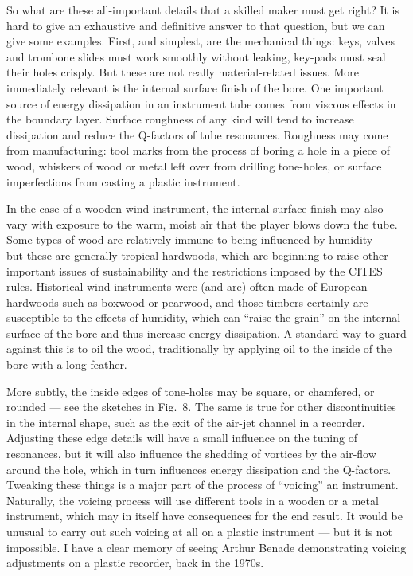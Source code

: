   So what are these all-important details that a skilled maker must get right? 
  It is hard to give an exhaustive and definitive answer to that question, but 
  we can give some examples. First, and simplest, are the mechanical things: 
  keys, valves and trombone slides must work smoothly without leaking, key-pads 
  must seal their holes crisply. But these are not really material-related 
  issues. More immediately relevant is the internal surface finish of the bore. 
  One important source of energy dissipation in an instrument tube comes from 
  viscous effects in the boundary layer. Surface roughness of any kind will 
  tend to increase dissipation and reduce the Q-factors of tube resonances. 
  Roughness may come from manufacturing: tool marks from the process of boring 
  a hole in a piece of wood, whiskers of wood or metal left over from drilling 
  tone-holes, or surface imperfections from casting a plastic instrument. 

  In the case of a wooden wind instrument, the internal surface finish may also 
  vary with exposure to the warm, moist air that the player blows down the 
  tube. Some types of wood are relatively immune to being influenced by 
  humidity — but these are generally tropical hardwoods, which are beginning to 
  raise other important issues of sustainability and the restrictions imposed 
  by the CITES rules. Historical wind instruments were (and are) often made of 
  European hardwoods such as boxwood or pearwood, and those timbers certainly 
  are susceptible to the effects of humidity, which can “raise the grain” on 
  the internal surface of the bore and thus increase energy dissipation. A 
  standard way to guard against this is to oil the wood, traditionally by 
  applying oil to the inside of the bore with a long feather. 

  More subtly, the inside edges of tone-holes may be square, or chamfered, or 
  rounded — see the sketches in Fig.\ 8. The same is true for other 
  discontinuities in the internal shape, such as the exit of the air-jet 
  channel in a recorder. Adjusting these edge details will have a small 
  influence on the tuning of resonances, but it will also influence the 
  shedding of vortices by the air-flow around the hole, which in turn 
  influences energy dissipation and the Q-factors. Tweaking these things is a 
  major part of the process of “voicing” an instrument. Naturally, the voicing 
  process will use different tools in a wooden or a metal instrument, which may 
  in itself have consequences for the end result. It would be unusual to carry 
  out such voicing at all on a plastic instrument — but it is not impossible. I 
  have a clear memory of seeing Arthur Benade demonstrating voicing adjustments 
  on a plastic recorder, back in the 1970s. 



